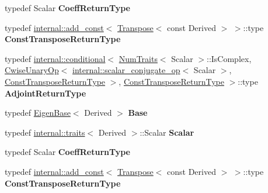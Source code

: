 \begin{DoxyCompactItemize}
\item 
\mbox{\label{class_eigen_1_1_solver_base_a8013b6454a87289d3e1cd138615af3d3}} 
typedef Scalar {\bfseries Coeff\+Return\+Type}
\item 
\mbox{\label{class_eigen_1_1_solver_base_ab99f15ef1fa6885e393ea809ca402946}} 
typedef \hyperlink{struct_eigen_1_1internal_1_1add__const}{internal\+::add\+\_\+const}$<$ \hyperlink{group___core___module_class_eigen_1_1_transpose}{Transpose}$<$ const Derived $>$ $>$\+::type {\bfseries Const\+Transpose\+Return\+Type}
\item 
\mbox{\label{class_eigen_1_1_solver_base_a8fd44c45359c0102af1a47752c2b8c82}} 
typedef \hyperlink{struct_eigen_1_1internal_1_1conditional}{internal\+::conditional}$<$ \hyperlink{group___core___module_struct_eigen_1_1_num_traits}{Num\+Traits}$<$ Scalar $>$\+::Is\+Complex, \hyperlink{group___core___module_class_eigen_1_1_cwise_unary_op}{Cwise\+Unary\+Op}$<$ \hyperlink{struct_eigen_1_1internal_1_1scalar__conjugate__op}{internal\+::scalar\+\_\+conjugate\+\_\+op}$<$ Scalar $>$, \hyperlink{group___core___module_class_eigen_1_1_transpose}{Const\+Transpose\+Return\+Type} $>$, \hyperlink{group___core___module_class_eigen_1_1_transpose}{Const\+Transpose\+Return\+Type} $>$\+::type {\bfseries Adjoint\+Return\+Type}
\item 
\mbox{\label{class_eigen_1_1_solver_base_a12798f4bbad57ef378b087801ab90cfe}} 
typedef \hyperlink{group___core___module_struct_eigen_1_1_eigen_base}{Eigen\+Base}$<$ Derived $>$ {\bfseries Base}
\item 
\mbox{\label{class_eigen_1_1_solver_base_a08184e3c085cce33f80b5a37376d52ab}} 
typedef \hyperlink{struct_eigen_1_1internal_1_1traits}{internal\+::traits}$<$ Derived $>$\+::Scalar {\bfseries Scalar}
\item 
\mbox{\label{class_eigen_1_1_solver_base_a8013b6454a87289d3e1cd138615af3d3}} 
typedef Scalar {\bfseries Coeff\+Return\+Type}
\item 
\mbox{\label{class_eigen_1_1_solver_base_ab99f15ef1fa6885e393ea809ca402946}} 
typedef \hyperlink{struct_eigen_1_1internal_1_1add__const}{internal\+::add\+\_\+const}$<$ \hyperlink{group___core___module_class_eigen_1_1_transpose}{Transpose}$<$ const Derived $>$ $>$\+::type {\bfseries Const\+Transpose\+Return\+Type}

\end{DoxyCompactItemize}
